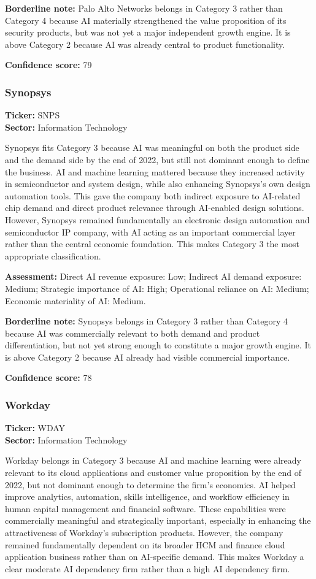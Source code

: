\documentclass{article}
\begin{document}
\textbf{Borderline note:} Palo Alto Networks belongs in Category 3 rather than Category 4 because AI materially strengthened the value proposition of its security products, but was not yet a major independent growth engine. It is above Category 2 because AI was already central to product functionality.

\textbf{Confidence score:} 79

\subsubsection*{Synopsys}
\textbf{Ticker:} SNPS \\
\textbf{Sector:} Information Technology

Synopsys fits Category 3 because AI was meaningful on both the product side and the demand side by the end of 2022, but still not dominant enough to define the business. AI and machine learning mattered because they increased activity in semiconductor and system design, while also enhancing Synopsys’s own design automation tools. This gave the company both indirect exposure to AI-related chip demand and direct product relevance through AI-enabled design solutions. However, Synopsys remained fundamentally an electronic design automation and semiconductor IP company, with AI acting as an important commercial layer rather than the central economic foundation. This makes Category 3 the most appropriate classification.

\textbf{Assessment:} Direct AI revenue exposure: Low; Indirect AI demand exposure: Medium; Strategic importance of AI: High; Operational reliance on AI: Medium; Economic materiality of AI: Medium.

\textbf{Borderline note:} Synopsys belongs in Category 3 rather than Category 4 because AI was commercially relevant to both demand and product differentiation, but not yet strong enough to constitute a major growth engine. It is above Category 2 because AI already had visible commercial importance.

\textbf{Confidence score:} 78

\subsubsection*{Workday}
\textbf{Ticker:} WDAY \\
\textbf{Sector:} Information Technology

Workday belongs in Category 3 because AI and machine learning were already relevant to its cloud applications and customer value proposition by the end of 2022, but not dominant enough to determine the firm’s economics. AI helped improve analytics, automation, skills intelligence, and workflow efficiency in human capital management and financial software. These capabilities were commercially meaningful and strategically important, especially in enhancing the attractiveness of Workday’s subscription products. However, the company remained fundamentally dependent on its broader HCM and finance cloud application business rather than on AI-specific demand. This makes Workday a clear moderate AI dependency firm rather than a high AI dependency firm.
\end{document}
